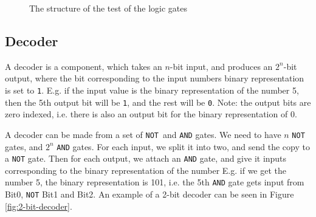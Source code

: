 \begin{figure}
    \centering
    \caption{The structure of the test of the logic gates}
    \label{fig:logic-test}
\end{figure}

\subsection{Decoder}
A decoder is a component, which takes an $n$-bit input, and produces an
$2^n$-bit output, where the bit corresponding to the input numbers binary
representation is set to \texttt{1}. E.g. if the input value is the binary
representation of the number 5, then the 5th output bit will be \texttt{1}, and
the rest will be \texttt{0}.  Note: the output bits are zero indexed, i.e.
there is also an output bit for the binary representation of 0.

A decoder can be made from a set of \texttt{NOT} and \texttt{AND}
gates\cite{ref:logic}. We need to have $n$ \texttt{NOT} gates, and $2^n$
\texttt{AND} gates. For each input, we split it into two, and send the copy to
a \texttt{NOT} gate. Then for each output, we attach an \texttt{AND} gate, and
give it inputs corresponding to the binary representation of the number
E.g. if we get the number 5, the binary representation is 101, i.e. the 5th
\texttt{AND} gate gets input from Bit0, \texttt{NOT} Bit1 and Bit2. An example
of a 2-bit decoder can be seen in Figure \ref{fig:2-bit-decoder}.

